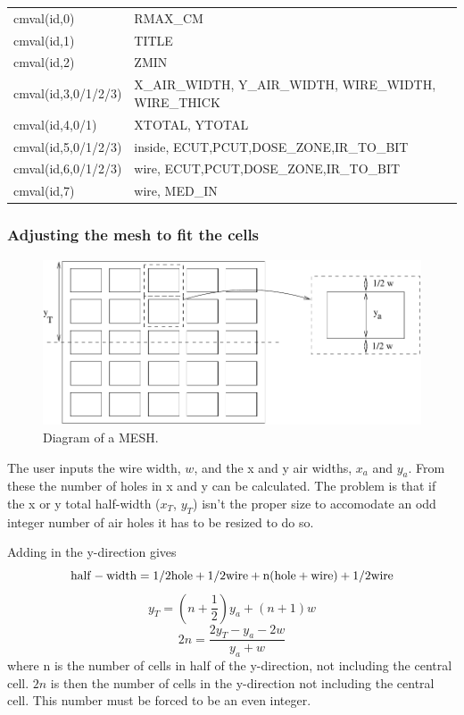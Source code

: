 \documentclass[12pt]{book}
\begin{document}
\begin{tabular}{|p{4.5cm}|p{11.5cm}|}\hline
cmval(id,0) &  RMAX\_CM \\
cmval(id,1) &  TITLE \\
cmval(id,2) &  ZMIN \\
cmval(id,3,0/1/2/3) &  X\_AIR\_WIDTH, Y\_AIR\_WIDTH, WIRE\_WIDTH, WIRE\_THICK \\
cmval(id,4,0/1) & XTOTAL, YTOTAL \\
cmval(id,5,0/1/2/3) & inside, ECUT,PCUT,DOSE\_ZONE,IR\_TO\_BIT\\
cmval(id,6,0/1/2/3) & wire, ECUT,PCUT,DOSE\_ZONE,IR\_TO\_BIT \\
cmval(id,7) & wire, MED\_IN \\\hline
\end{tabular}

\subsubsection{Adjusting the mesh to fit the cells}
\begin{figure}[htbp]
\vspace{1.8in}
\includegraphics{figures/meshfig}
\caption{Diagram of a MESH.  \label{meshfig}}
\end{figure}

The user inputs the wire width, $w$, and the x and y air widths, $x_a$
and $y_a$.  From these the number of holes in x and y can be calculated.
The problem is that if the x or y total half-width ($x_T$, $y_T$)
isn't the proper size to accomodate an odd integer number of air holes it
has to be resized to do so.

Adding in the y-direction gives
$${\rm half-width = 1/2 hole + 1/2 wire + n (hole+wire) + 1/2 wire}$$
$$y_T=(n+\frac{1}{2})y_a+(n+1)w$$
$$2n=\frac{2y_T-y_a-2w}{y_a+w}$$
where n is the number of cells in half of the y-direction, not including
the central cell.  $2n$ is then the number of cells in the y-direction
not including the central cell.  This number must be forced to be an
even integer.
\end{document}
